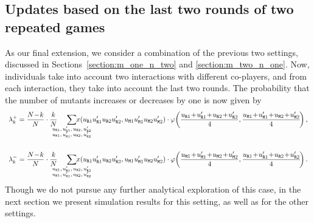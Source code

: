 \documentclass[11pt]{article}
\def\resident{\texttt{R}}
\def\mutant{\texttt{M}}
\theoremstyle{plainCl1}
\theoremstyle{plainCl2}
\begin{document}

\subsection{Updates based on the last two rounds of two repeated games}\label{section:m_two_n_two}

As our final extension, we consider a combination of the previous two settings, discussed in Sections~\ref{section:m_one_n_two} and \ref{section:m_two_n_one}. 
Now, individuals take into account two interactions with different co-players, and from each interaction, they take into account the last two rounds. 
The probability that the number of mutants increases or decreases by one is now given by
\begin{equation}\label{eq:ratio_TwoRounds}
\begin{array}{l}
\displaystyle \lambda^+_k=\frac{N\!-\!k}{N}\cdot \frac{k}{N} 
\hspace{-0.5cm}
\sum_
{\scriptsize \begin{array}{l}
u_{\resident 1},u_{\resident 1}', u_{\resident 2},u_{\resident 2}'\\
u_{\mutant 1},u_{\mutant 1}', u_{\mutant 2},u_{\mutant 2}'
\end{array}} 
\hspace{-1cm} x(u_{\resident 1} u_{\resident 1}'u_{\resident 2} u_{\resident 2}' ,u_{\mutant 1}u_{\mutant 1}'u_{\mutant 2}u_{\mutant 2}')\cdot 
\varphi\!\left(\frac{u_{\resident 1}\!+\! u_{\resident 1}'\!+\!u_{\resident 2}\!+\!u_{\resident 2}' }{4},
\frac{u_{\mutant 1}\!+\!u_{\mutant 1}'\!+\!u_{\mutant 2}\!+\!u_{\mutant 2}'}{4}\!\right), \\[1.4cm]

\displaystyle \lambda^-_k=\frac{N\!-\!k}{N}\cdot \frac{k}{N} 
\hspace{-0.5cm}
\sum_
{\scriptsize \begin{array}{l}
u_{\resident 1},u_{\resident 1}', u_{\resident 2},u_{\resident 2}'\\
u_{\mutant 1},u_{\mutant 1}', u_{\mutant 2},u_{\mutant 2}'
\end{array}} 
\hspace{-1cm} x(u_{\resident 1} u_{\resident 1}'u_{\resident 2} u_{\resident 2}' ,u_{\mutant 1}u_{\mutant 1}'u_{\mutant 2}u_{\mutant 2}')\cdot 
\varphi\!\left(\frac{u_{\mutant 1}\!+\!u_{\mutant 1}'\!+\!u_{\mutant 2}\!+\!u_{\mutant 2}'}{4},
\frac{u_{\resident 1}\!+\! u_{\resident 1}'\!+\!u_{\resident 2}\!+\!u_{\resident 2}' }{4}\!\right).
\end{array}
\end{equation}
 Though we do not pursue any further analytical exploration of this case, in the
next section we present simulation results for this setting, as well as for the other settings.\\
\end{document}
